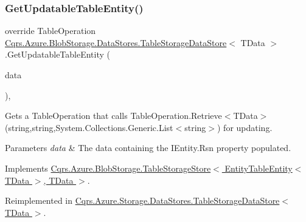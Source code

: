 \subsubsection{\texorpdfstring{Get\+Updatable\+Table\+Entity()}{GetUpdatableTableEntity()}\hspace{0.1cm}{\footnotesize\ttfamily [1/2]}}
{\footnotesize\ttfamily override Table\+Operation \hyperlink{classCqrs_1_1Azure_1_1BlobStorage_1_1DataStores_1_1TableStorageDataStore}{Cqrs.\+Azure.\+Blob\+Storage.\+Data\+Stores.\+Table\+Storage\+Data\+Store}$<$ T\+Data $>$.Get\+Updatable\+Table\+Entity (\begin{DoxyParamCaption}\item[{T\+Data}]{data }\end{DoxyParamCaption})\hspace{0.3cm}{\ttfamily [protected]}, {\ttfamily [virtual]}}



Gets a Table\+Operation that calls Table\+Operation.\+Retrieve$<$\+T\+Data$>$(string,string,\+System.\+Collections.\+Generic.\+List$<$string$>$) for updating. 


\begin{DoxyParams}{Parameters}
{\em data} & The data containing the I\+Entity.\+Rsn property populated.\\
\hline
\end{DoxyParams}


Implements \hyperlink{classCqrs_1_1Azure_1_1BlobStorage_1_1TableStorageStore_ae476c94b77d9c602aef934bd8c1b20ea_ae476c94b77d9c602aef934bd8c1b20ea}{Cqrs.\+Azure.\+Blob\+Storage.\+Table\+Storage\+Store$<$ Entity\+Table\+Entity$<$ T\+Data $>$, T\+Data $>$}.



Reimplemented in \hyperlink{classCqrs_1_1Azure_1_1Storage_1_1DataStores_1_1TableStorageDataStore_a54f00f53521e285568f19c29527d6466_a54f00f53521e285568f19c29527d6466}{Cqrs.\+Azure.\+Storage.\+Data\+Stores.\+Table\+Storage\+Data\+Store$<$ T\+Data $>$}.

\mbox{\label{classCqrs_1_1Azure_1_1BlobStorage_1_1DataStores_1_1TableStorageDataStore_a2a6af1eed637f7ac828078a883881fd3_a2a6af1eed637f7ac828078a883881fd3}} 
